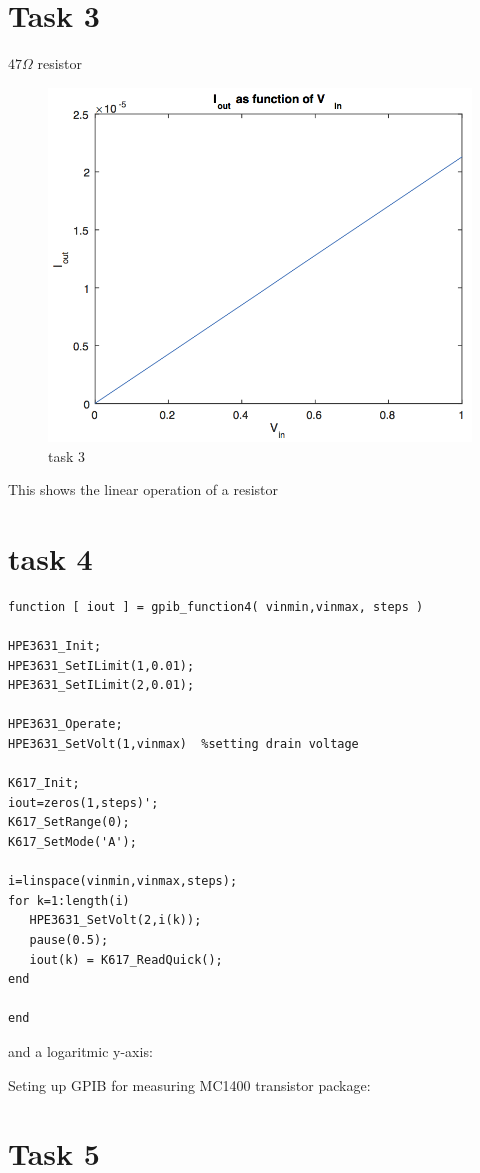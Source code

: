 \documentclass[11pt,a4paper,final]{report}
\begin{document}
\section{Task 3}
$47 \Omega $ resistor
\begin{figure}[h!bt!p]
\caption{task 3}
\includegraphics[scale=0.7]{3task3.png}
\end{figure}
This shows the linear operation of a resistor
\section{task 4}
\begin{verbatim}
function [ iout ] = gpib_function4( vinmin,vinmax, steps )

HPE3631_Init;
HPE3631_SetILimit(1,0.01);
HPE3631_SetILimit(2,0.01);

HPE3631_Operate;
HPE3631_SetVolt(1,vinmax)  %setting drain voltage

K617_Init;
iout=zeros(1,steps)';
K617_SetRange(0);
K617_SetMode('A');

i=linspace(vinmin,vinmax,steps);
for k=1:length(i)
   HPE3631_SetVolt(2,i(k));
   pause(0.5);
   iout(k) = K617_ReadQuick();
end

end
\end{verbatim}


and a logaritmic y-axis:

Seting up GPIB for measuring MC1400 transistor package:



\section{Task 5}
\end{document}
